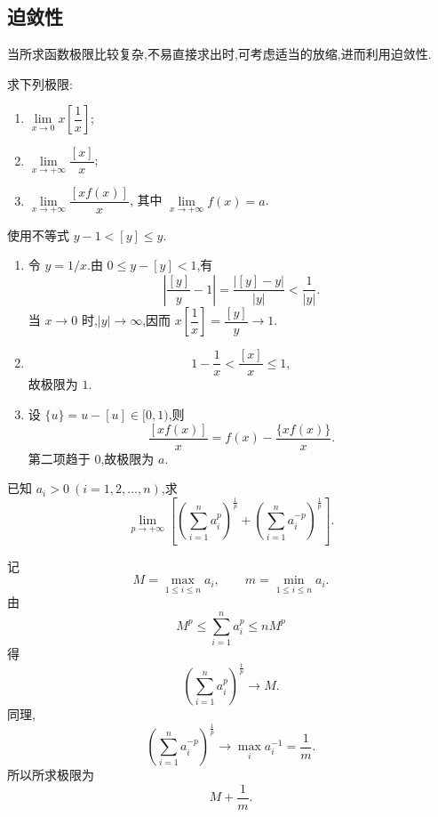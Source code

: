 \subsection{迫敛性}

当所求函数极限比较复杂,不易直接求出时,可考虑适当的放缩,进而利用迫敛性.

\begin{example}
    求下列极限:
    \begin{enumerate}
        \item $\displaystyle\lim\limits_{x\to0}x\left[\dfrac{1}{x}\right]$;
        \item $\displaystyle\lim\limits_{x\to+\infty}\dfrac{[x]}{x}$;
        \item $\displaystyle\lim\limits_{x\to+\infty}\dfrac{[xf(x)]}{x}$,
              其中 $\displaystyle\lim\limits_{x\to+\infty}f(x)=a$.
    \end{enumerate}
\end{example}
\exampleblank

\begin{solution}
    使用不等式 $y-1<[y]\leq y$.
    \begin{enumerate}
        \item 令 $y=1/x$.由 $0\leq y-[y]<1$,有
              \[
                  \left|\dfrac{[y]}{y}-1\right|
                  =\dfrac{|[y]-y|}{|y|}<\dfrac{1}{|y|}.
              \]
              当 $x\to0$ 时,$|y|\to\infty$,因而
              $x\left[\dfrac{1}{x}\right]=\dfrac{[y]}{y}\to1$.
        \item
              \[
                  1-\dfrac{1}{x}<\dfrac{[x]}{x}\leq1,
              \]
              故极限为 $1$.
        \item 设 $\{u\}=u-[u]\in\lbrack0,1)$,则
              \[
                  \dfrac{[xf(x)]}{x}=f(x)-\dfrac{\{xf(x)\}}{x}.
              \]
              第二项趋于 $0$,故极限为 $a$.
    \end{enumerate}
\end{solution}

\begin{example}
    已知 $a_i>0\ (i=1,2,\ldots,n)$,求
    \[
        \lim\limits_{p\to+\infty}
        \left[
            \left(\sum\limits_{i=1}^n a_i^p\right)^{\frac{1}{p}}
            +
            \left(\sum\limits_{i=1}^n a_i^{-p}\right)^{\frac{1}{p}}
            \right].
    \]
\end{example}
\exampleblank

\begin{solution}
    记
    \[
        M=\max\limits_{1\leq i\leq n}a_i,
        \qquad
        m=\min\limits_{1\leq i\leq n}a_i.
    \]
    由
    \[
        M^p\leq\sum\limits_{i=1}^{n}a_i^p\leq nM^p
    \]
    得
    \[
        \left(\sum\limits_{i=1}^{n}a_i^p\right)^{\frac{1}{p}}\longrightarrow M.
    \]
    同理,
    \[
        \left(\sum\limits_{i=1}^{n}a_i^{-p}\right)^{\frac{1}{p}}
        \longrightarrow\max\limits_i a_i^{-1}=\dfrac{1}{m}.
    \]
    所以所求极限为
    \[
        M+\dfrac{1}{m}.
    \]
\end{solution}



